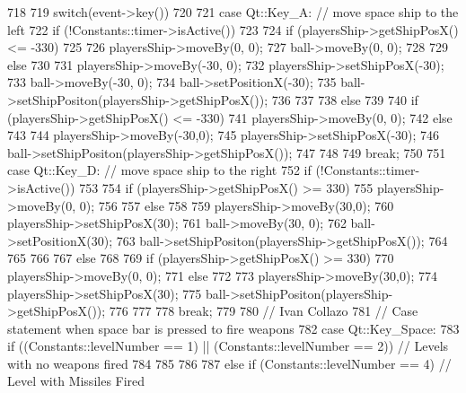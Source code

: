 \begin{DoxyCode}
718 {
719     switch(event->key())
720     {
721         case Qt::Key_A: // move space ship to the left
722             if (!Constants::timer->isActive())
723             {
724                 if (playersShip->getShipPosX() <= -330)
725                 {
726                     playersShip->moveBy(0, 0);
727                     ball->moveBy(0, 0);
728                 }
729                 else
730                 {
731                     playersShip->moveBy(-30, 0);
732                     playersShip->setShipPosX(-30);
733                     ball->moveBy(-30, 0);
734                     ball->setPositionX(-30);
735                     ball->setShipPositon(playersShip->getShipPosX());
736                 }
737             }
738             else
739             {
740                 if (playersShip->getShipPosX() <= -330)
741                     playersShip->moveBy(0, 0);
742                 else
743                 {
744                     playersShip->moveBy(-30,0);
745                     playersShip->setShipPosX(-30);
746                     ball->setShipPositon(playersShip->getShipPosX());
747                 }
748             }
749             break;
750 
751         case Qt::Key_D: // move space ship to the right
752             if (!Constants::timer->isActive())
753             {
754                 if (playersShip->getShipPosX() >= 330)
755                     playersShip->moveBy(0, 0);
756 
757                 else
758                 {
759                     playersShip->moveBy(30,0);
760                     playersShip->setShipPosX(30);
761                     ball->moveBy(30, 0);
762                     ball->setPositionX(30);
763                     ball->setShipPositon(playersShip->getShipPosX());
764                 }
765             }
766 
767             else
768             {
769                 if (playersShip->getShipPosX() >= 330)
770                     playersShip->moveBy(0, 0);
771                 else
772                 {
773                     playersShip->moveBy(30,0);
774                     playersShip->setShipPosX(30);
775                     ball->setShipPositon(playersShip->getShipPosX());
776                 }
777             }
778             break;
779 
780         // Ivan Collazo
781         // Case statement when space bar is pressed to fire weapons
782         case Qt::Key_Space:
783              if ((Constants::levelNumber == 1) || (Constants::levelNumber == 2)) 
      // Levels with no weapons fired
784              {
785 
786              }
787              else if (Constants::levelNumber == 4) // Level with Missiles Fired
}}
\end{DoxyCode}
